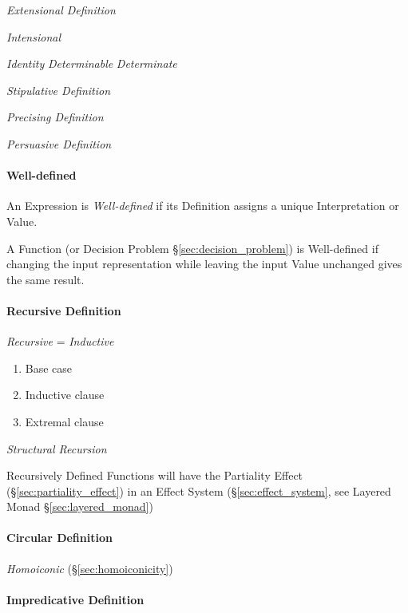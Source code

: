 \emph{Extensional Definition}

\emph{Intensional}

\emph{Identity} \emph{Determinable} \emph{Determinate}

\emph{Stipulative Definition}

\emph{Precising Definition}

\emph{Persuasive Definition}



\paragraph{Well-defined}\label{sec:well_defined}\hfill

An Expression is \emph{Well-defined} if its Definition assigns a
unique Interpretation or Value.

A Function (or Decision Problem \S\ref{sec:decision_problem}) is
Well-defined if changing the input representation while leaving the
input Value unchanged gives the same result. %



\paragraph{Recursive Definition}\label{sec:recursive_definition}\hfill

\emph{Recursive} = \emph{Inductive}

\begin{enumerate}
    \item Base case
    \item Inductive clause
    \item Extremal clause
\end{enumerate}

\emph{Structural Recursion}

Recursively Defined Functions will have the Partiality Effect
(\S\ref{sec:partiality_effect}) in an Effect System
(\S\ref{sec:effect_system}, see Layered Monad
\S\ref{sec:layered_monad})



\paragraph{Circular Definition}\label{sec:circular_definition}\hfill

\emph{Homoiconic} (\S\ref{sec:homoiconicity})



\paragraph{Impredicative Definition}\label{sec:impredicative_definition}\hfill

